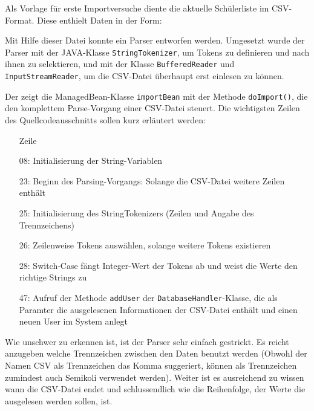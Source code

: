 Als Vorlage für erste Importversuche diente die aktuelle Schülerliste im CSV-Format. Diese enthielt Daten in der Form:
	

Mit Hilfe dieser Datei konnte ein Parser entworfen werden. Umgesetzt wurde der Parser mit der JAVA-Klasse \texttt{StringTokenizer}, um Tokens zu definieren und nach ihnen zu selektieren, und mit der Klasse \texttt{BufferedReader} und \texttt{InputStreamReader}, um die CSV-Datei überhaupt erst einlesen zu können. 

Der  zeigt die ManagedBean-Klasse \texttt{importBean} mit der Methode \texttt{doImport()}, die den komplettem Parse-Vorgang einer CSV-Datei steuert.
Die wichtigsten Zeilen des Quellcodeausschnitts sollen kurz erläutert werden:
\begin{itemize}
  \item[Zeile]
  \item[08:] Initialisierung der String-Variablen
  \item[23:] Beginn des Parsing-Vorgangs: Solange die CSV-Datei weitere Zeilen enthält
  \item[25:] Initialisierung des StringTokenizers (Zeilen und Angabe des Trennzeichens)
  \item[26:] Zeilenweise Tokens auswählen, solange weitere Tokens existieren
  \item[28:] Switch-Case fängt Integer-Wert der Tokens ab und weist die Werte den richtige Strings zu
  \item[47:] Aufruf der Methode \texttt{addUser} der \texttt{DatabaseHandler}-Klasse, die als Paramter die ausgelesenen Informationen der CSV-Datei enthält und einen neuen User im System anlegt
\end{itemize}

Wie unschwer zu erkennen ist, ist der Parser sehr einfach gestrickt. Es reicht anzugeben welche Trennzeichen zwischen den Daten benutzt werden (Obwohl der Namen CSV als Trennzeichen das Komma suggeriert, können als Trennzeichen zumindest auch Semikoli verwendet werden).
Weiter ist es ausreichend zu wissen wann die CSV-Datei endet und schlussendlich wie die Reihenfolge, der Werte die ausgelesen werden sollen, ist.

